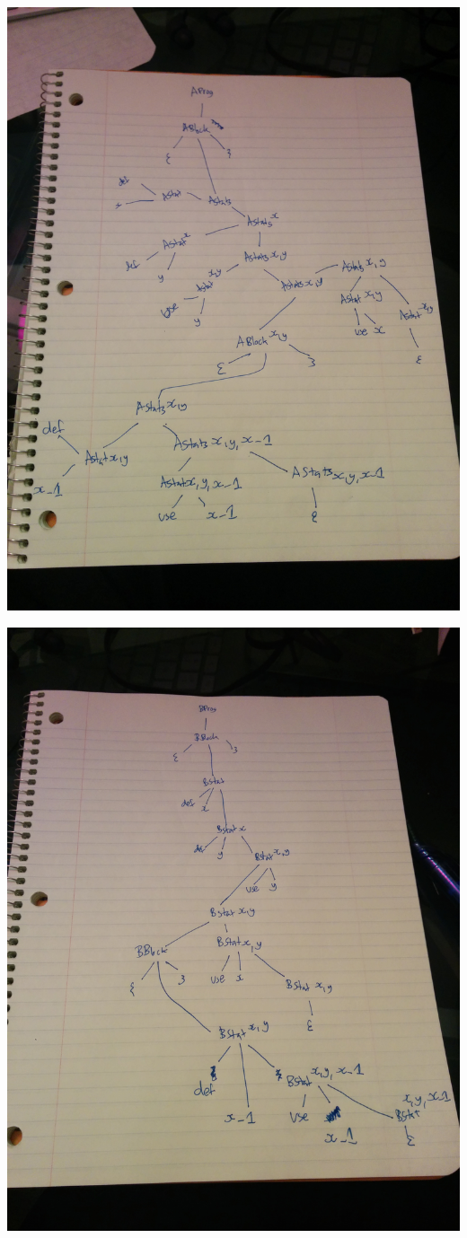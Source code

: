 \documentclass[11pt, oneside]{article}   	%
\begin{document}
\includegraphics[scale=0.19]{IMG_20141008_212636.jpg}

\includegraphics[scale=0.19]{IMG_20141008_212321.jpg}
\end{document}
